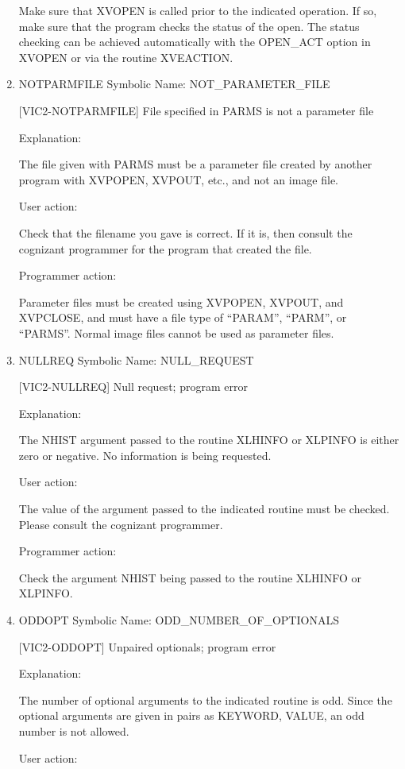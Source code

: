 \begin{enumerate}
Make sure that XVOPEN is called prior to the indicated operation.
If so, make sure that the program checks the status of the open.
The status checking can be achieved automatically with the
OPEN\_ACT option in XVOPEN or via the routine XVEACTION.


\item NOTPARMFILE Symbolic Name: NOT\_PARAMETER\_FILE

[VIC2-NOTPARMFILE] File specified in PARMS is not a parameter file

Explanation:

The file given with PARMS must be a parameter file created by
another program with XVPOPEN, XVPOUT, etc., and not an image file.

User action:

Check that the filename you gave is correct.  If it is, then
consult the cognizant programmer for the program that created the file.

Programmer action:

Parameter files must be created using XVPOPEN, XVPOUT,
and XVPCLOSE, and must have a file type of ``PARAM'', ``PARM'',
or ``PARMS''.  Normal image files cannot be used as parameter files.


\item NULLREQ Symbolic Name: NULL\_REQUEST

[VIC2-NULLREQ] Null request; program error

Explanation:

The NHIST argument passed to the routine XLHINFO or XLPINFO is either
zero or negative.  No information is being requested.

User action:

The value of the argument passed to the indicated routine must be
checked. Please consult the cognizant programmer.

Programmer action:

Check the argument NHIST being passed to the routine XLHINFO or XLPINFO.


\item ODDOPT Symbolic Name: ODD\_NUMBER\_OF\_OPTIONALS

[VIC2-ODDOPT] Unpaired optionals; program error

Explanation:

The number of optional arguments to the indicated routine is odd.
Since the optional arguments are given in pairs as KEYWORD, VALUE,
an odd number is not allowed.

User action:


\end{enumerate}
